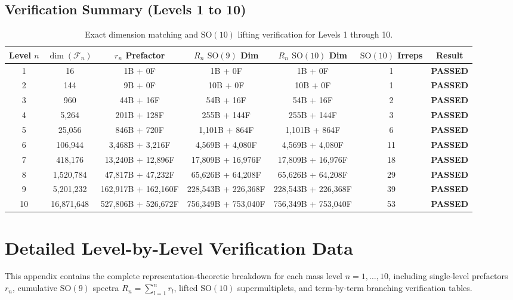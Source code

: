 \documentclass[11pt,a4paper]{article}
\begin{document}
\subsection{Verification Summary (Levels 1 to 10)}
\begin{table}[ht!]
\centering
\small
\begin{tabular}{@{}ccccccc@{}}
\toprule
Level $n$ & $\dim(\mathcal{F}_n)$ & $r_n$ Prefactor & $R_n$ $\mathrm{SO}(9)$ Dim & $R_n$ $\mathrm{SO}(10)$ Dim & $\mathrm{SO}(10)$ Irreps & Result \\
\midrule
1 & 16 & 1B + 0F & 1B + 0F & 1B + 0F & 1 & \textbf{PASSED} \\
2 & 144 & 9B + 0F & 10B + 0F & 10B + 0F & 1 & \textbf{PASSED} \\
3 & 960 & 44B + 16F & 54B + 16F & 54B + 16F & 2 & \textbf{PASSED} \\
4 & 5,264 & 201B + 128F & 255B + 144F & 255B + 144F & 3 & \textbf{PASSED} \\
5 & 25,056 & 846B + 720F & 1,101B + 864F & 1,101B + 864F & 6 & \textbf{PASSED} \\
6 & 106,944 & 3,468B + 3,216F & 4,569B + 4,080F & 4,569B + 4,080F & 11 & \textbf{PASSED} \\
7 & 418,176 & 13,240B + 12,896F & 17,809B + 16,976F & 17,809B + 16,976F & 18 & \textbf{PASSED} \\
8 & 1,520,784 & 47,817B + 47,232F & 65,626B + 64,208F & 65,626B + 64,208F & 29 & \textbf{PASSED} \\
9 & 5,201,232 & 162,917B + 162,160F & 228,543B + 226,368F & 228,543B + 226,368F & 39 & \textbf{PASSED} \\
10 & 16,871,648 & 527,806B + 526,672F & 756,349B + 753,040F & 756,349B + 753,040F & 53 & \textbf{PASSED} \\
\bottomrule
\end{tabular}
\caption{Exact dimension matching and $\mathrm{SO}(10)$ lifting verification for Levels 1 through 10.}
\end{table}

\newpage
\appendix
\section{Detailed Level-by-Level Verification Data}
\label{sec:appendix_data}
This appendix contains the complete representation-theoretic breakdown for each mass level $n=1,\dots,10$, including single-level prefactors $r_n$, cumulative $\mathrm{SO}(9)$ spectra $R_n = \sum_{l=1}^n r_l$, lifted $\mathrm{SO}(10)$ supermultiplets, and term-by-term branching verification tables.
\end{document}
